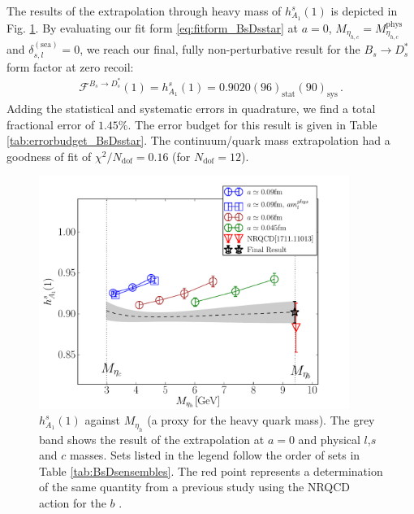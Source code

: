The results of the extrapolation through heavy mass of $h_{A_1}^s(1)$ is depicted in Fig. \ref{fig:hA1_vsmetah}. By evaluating our fit form \eqref{eq:fitform_BsDsstar} at $a=0$, $M_{\eta_{h,c}}=M_{\eta_{h,c}}^{\text{phys}}$ and $\delta_{s,l}^{(\text{sea})}=0$, we reach our final, fully non-perturbative result for the $B_s\to D_s^*$ form factor at zero recoil:
\begin{align}
  \mathcal{F}^{B_s\to D_s^*}(1) = h^s_{A_1}(1) = 0.9020(96)_{\text{stat}}(90)_{\text{sys}}\,.
  \label{eq:finalresult_hA1}
\end{align}
Adding the statistical and systematic errors in quadrature, we find a total fractional error of $1.45\%$. The error budget for this result is given in Table \ref{tab:errorbudget_BsDsstar}. The continuum/quark mass extrapolation had a goodness of fit of $\chi^2/N_{\text{dof}} = 0.16$ (for $N_{\text{dof}}=12$).

\begin{figure}[htb!]
  \begin{center}
  \includegraphics[width=0.90\textwidth]{images/BsDsstar/hA1_vsmh.pdf}
  \caption{ $h_{A_1}^s(1)$ against $M_{\eta_h}$ (a proxy for the heavy quark mass). The grey band shows the result of the extrapolation at $a=0$ and physical $l$,$s$ and $c$ masses. Sets listed in the legend follow the order of sets in Table \ref{tab:BsDsensembles}. The red point represents a determination of the same quantity from a previous study using the NRQCD action for the $b$ \cite{Harrison:2017fmw}. \label{fig:hA1_vsmetah}}
  \end{center}
\end{figure}


